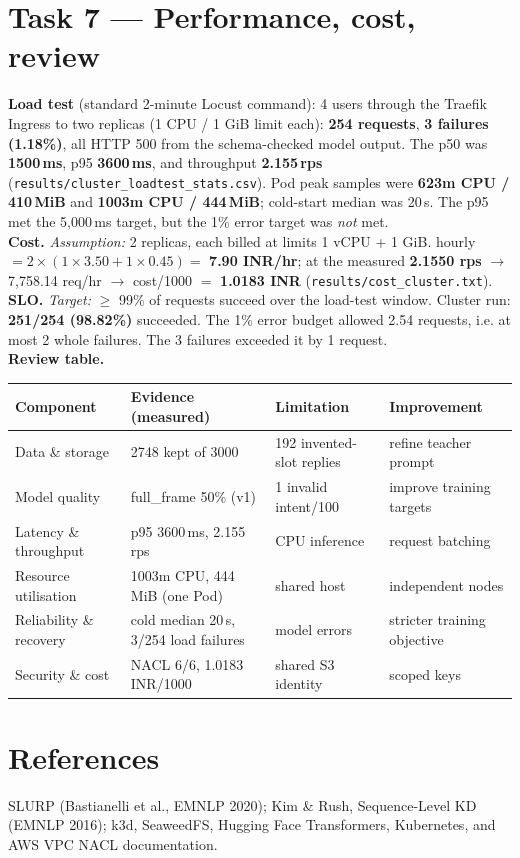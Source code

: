 \documentclass[10pt,a4paper]{article}
\newcommand{\code}[1]{\texttt{\small #1}}
\begin{document}
\section{Task 7 --- Performance, cost, review}
\textbf{Load test} (standard 2-minute Locust command): 4 users through the Traefik Ingress to two
replicas (1 CPU / 1 GiB limit each): \textbf{254 requests}, \textbf{3 failures (1.18\%)}, all HTTP 500
from the schema-checked model output. The p50 was \textbf{1500\,ms}, p95 \textbf{3600\,ms}, and throughput
\textbf{2.155\,rps} (\code{results/cluster\_loadtest\_stats.csv}). Pod peak samples were
\textbf{623m CPU / 410\,MiB} and \textbf{1003m CPU / 444\,MiB}; cold-start median was 20\,s.
The p95 met the 5{,}000\,ms target, but the 1\% error target was \emph{not} met.\\
\textbf{Cost.} \textit{Assumption:} 2 replicas, each billed at limits 1 vCPU + 1 GiB. hourly $= 2 \times
(1{\times}3.50 + 1{\times}0.45) = $ \textbf{7.90 INR/hr}; at the measured \textbf{2.1550 rps} $\rightarrow$
7{,}758.14 req/hr $\rightarrow$ cost/1000 $=$ \textbf{1.0183 INR} (\code{results/cost\_cluster.txt}).\\
\textbf{SLO.} \textit{Target:} $\geq$ 99\% of requests succeed over the load-test window. Cluster run:
\textbf{251/254 (98.82\%)} succeeded. The 1\% error budget allowed 2.54 requests, i.e. at most 2 whole
failures. The 3 failures exceeded it by 1 request.\\
\textbf{Review table.}

\begin{center}\small
\begin{tabular}{p{3.0cm}p{4.3cm}p{3.1cm}p{4.3cm}}
\toprule
Component & Evidence (measured) & Limitation & Improvement \\
\midrule
Data \& storage & 2748 kept of 3000 & 192 invented-slot replies & refine teacher prompt \\
Model quality & full\_frame 50\% (v1) & 1 invalid intent/100 & improve training targets \\
Latency \& throughput & p95 3600\,ms, 2.155 rps & CPU inference & request batching \\
Resource utilisation & 1003m CPU, 444\,MiB (one Pod) & shared host & independent nodes \\
Reliability \& recovery & cold median 20\,s, 3/254 load failures & model errors & stricter training objective \\
Security \& cost & NACL 6/6, 1.0183 INR/1000 & shared S3 identity & scoped keys \\
\bottomrule
\end{tabular}
\end{center}

\section{References}
SLURP (Bastianelli et al., EMNLP 2020); Kim \& Rush, Sequence-Level KD (EMNLP 2016); k3d, SeaweedFS, Hugging
Face Transformers, Kubernetes, and AWS VPC NACL documentation.
\end{document}
